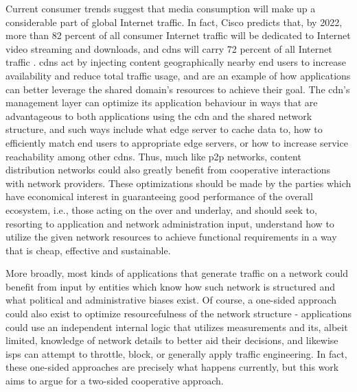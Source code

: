     Current consumer trends suggest that media consumption will make up a considerable part of global Internet traffic.
    In fact, Cisco predicts that, by 2022, more than 82 percent of all consumer Internet traffic will be dedicated to Internet video streaming and downloads, and \glspl{cdn} will carry 72 percent of all Internet traffic \cite{cisco2019}.
    \glspl{cdn} act by injecting content geographically nearby end users to increase availability and reduce total traffic usage, and are an example of how applications can better leverage the shared domain's resources to achieve their goal.
    The \gls{cdn}'s management layer can optimize its application behaviour in ways that are advantageous to both applications using the \gls{cdn} and the shared network structure, and such ways include what edge server to cache data to, how to efficiently match end users to appropriate edge servers, or how to increase service reachability among other \glspl{cdn}.
    Thus, much like \gls{p2p} networks, content distribution networks could also greatly benefit from cooperative interactions with network providers.
    These optimizations should be made by the parties which have economical interest in guaranteeing good performance of the overall ecosystem, i.e., those acting on the over and underlay, and should seek to, resorting to application and network administration input, understand how to utilize the given network resources to achieve functional requirements in a way that is cheap, effective and sustainable.

    More broadly, most kinds of applications that generate traffic on a network could benefit from input by entities which know how such network is structured and what political and administrative biases exist.
    Of course, a one-sided approach could also exist to optimize resourcefulness of the network structure - applications could use an independent internal logic that utilizes measurements and its, albeit limited, knowledge of network details to better aid their decisions, and likewise \glspl{isp} can attempt to throttle, block, or generally apply traffic engineering.
    In fact, these one-sided approaches are precisely what happens currently, but this work aims to argue for a two-sided cooperative approach.

